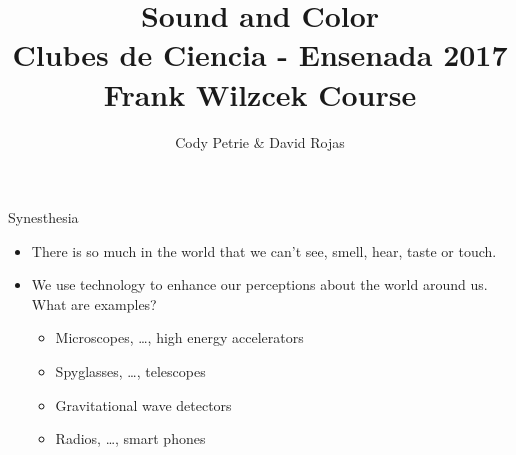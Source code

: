 \documentclass{beamer}
\title[{\color{white}{Day 1}}]{{\Huge Sound and Color} \\ {\normalsize Clubes de Ciencia - Ensenada 2017 \\ Frank Wilzcek Course}}
\author{Cody Petrie \& David Rojas}
\institute{Universidad Aut\'onoma de Baja California}
\date{}
\begin{document}
\begin{frame}
   \titlepage
\end{frame}



\begin{frame}[t]{Synesthesia}
   \begin{itemize}
      \item There is so much in the world that we can't see, smell, hear, taste or touch.
      \item We use technology to enhance our perceptions about the world around us. What are examples?
      \begin{itemize}
         \item<2> Microscopes, \ldots , high energy accelerators
         \item<2> Spyglasses, \ldots , telescopes
         \item<2> Gravitational wave detectors
         \item<2> Radios, \ldots , smart phones
      \end{itemize}
   \end{itemize}
\end{frame}
\end{document}
